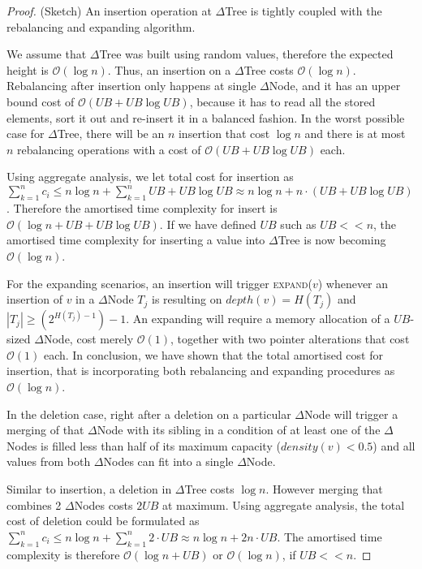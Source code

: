 \begin{proof} (Sketch) An insertion operation at $\Delta$Tree is tightly coupled
with the rebalancing and expanding algorithm. 

We assume that $\Delta$Tree was built using random values, therefore the 
expected height is $\mathcal{O}(\log n)$. 
Thus, an insertion on a $\Delta$Tree costs $\mathcal{O}(\log n)$. 
Rebalancing after insertion only happens
at single $\Delta$Node, and it has an upper bound cost of $\mathcal{O}(UB + UB \log UB)$,
because it has to read all the stored elements, sort it out and re-insert it in a balanced fashion.  
In the worst possible case for $\Delta$Tree, there will be an $n$ insertion 
that cost $\log n$ and there is at most $n$ rebalancing operations with a cost of
$\mathcal{O}(UB + UB \log UB)$ each. 

Using aggregate analysis, we let total cost for insertion 
as $\displaystyle\sum_{k=1}^{n} c_{i} \leqslant n\log n + \displaystyle\sum_{k=1}^{n} UB + UB \log UB
\approx n \log n + n \cdot (UB + UB \log UB)$. Therefore the amortised time complexity 
for insert is $\mathcal{O}(\log n + UB + UB \log UB)$. If we have defined $UB$ such as 
$UB<<n$, the amortised time complexity for inserting a value into $\Delta$Tree 
is now becoming $\mathcal{O}(\log n)$.

For the expanding scenarios, an insertion will trigger \textsc{expand}($v$)
whenever an insertion of $v$ in a $\Delta$Node $T_j$ is resulting on $depth(v) = H(T_j)$ and
$|T_j|\geqslant (2^{H(T_j)-1})-1$. An expanding will require a memory allocation
of a $UB$-sized $\Delta$Node, cost merely $\mathcal{O}(1)$, together with two pointer
alterations that cost $\mathcal{O}(1)$ each. In conclusion, we have shown that
the total amortised cost for insertion, that is incorporating both rebalancing
and expanding procedures as $\mathcal{O}(\log n)$.

In the deletion case, right after a deletion on a particular $\Delta$Node 
will trigger a merging of that $\Delta$Node with its sibling in a condition 
of at least one of the $\Delta$Nodes is filled less than half
of its maximum capacity ($density(v) < 0.5$) and all values from both 
$\Delta$Nodes can fit into a single $\Delta$Node.

Similar to insertion, a deletion in $\Delta$Tree costs $\log n$. However merging that combines
2 $\Delta$Nodes costs $2UB$ at maximum. Using aggregate analysis, 
the total cost of deletion could be formulated as
$\displaystyle\sum_{k=1}^{n} c_{i} \leqslant n\log n + \displaystyle\sum_{k=1}^{n} 2\cdot UB
\approx n \log n + 2n \cdot UB$. The amortised time complexity is 
therefore $\mathcal{O}(\log n + UB)$ or $\mathcal{O}(\log n)$, if $UB<<n$.

\end{proof}



